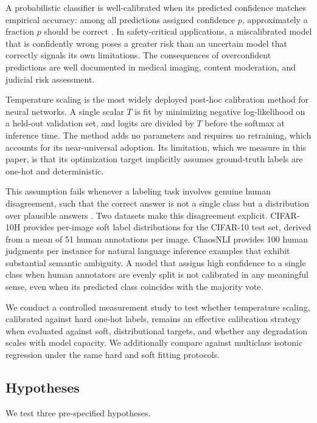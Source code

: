 \documentclass[11pt,a4paper]{article}
\theoremstyle{definition}
\begin{document}
A probabilistic classifier is well-calibrated when its predicted
confidence matches empirical accuracy: among all predictions assigned
confidence $p$, approximately a fraction $p$ should be correct
\cite{Dawid1982}. In safety-critical applications, a miscalibrated model
that is confidently wrong poses a greater risk than an uncertain model
that correctly signals its own limitations. The consequences of
overconfident predictions are well documented in medical imaging,
content moderation, and judicial risk assessment.

Temperature scaling \cite{Guo2017} is the most widely deployed post-hoc
calibration method for neural networks. A single scalar $T$ is fit by
minimizing negative log-likelihood on a held-out validation set, and
logits are divided by $T$ before the softmax at inference time. The
method adds no parameters and requires no retraining, which accounts for
its near-universal adoption. Its limitation, which we measure in this
paper, is that its optimization target implicitly assumes ground-truth
labels are one-hot and deterministic.

This assumption fails whenever a labeling task involves genuine human
disagreement, such that the correct answer is not a single class but a
distribution over plausible answers \cite{Aroyo2015}. Two datasets make
this disagreement explicit. CIFAR-10H \cite{Peterson2019} provides
per-image soft label distributions for the CIFAR-10 test set, derived
from a mean of 51 human annotations per image. ChaosNLI \cite{Nie2020}
provides 100 human judgments per instance for natural language inference
examples that exhibit substantial semantic ambiguity. A model that
assigns high confidence to a single class when human annotators are
evenly split is not calibrated in any meaningful sense, even when its
predicted class coincides with the majority vote.

We conduct a controlled measurement study to test whether temperature
scaling, calibrated against hard one-hot labels, remains an effective
calibration strategy when evaluated against soft, distributional
targets, and whether any degradation scales with model capacity. We
additionally compare against multiclass isotonic regression
\cite{Zadrozny2002} under the same hard and soft fitting protocols.

\subsection{Hypotheses}

We test three pre-specified hypotheses.
\end{document}
